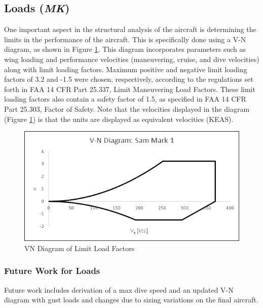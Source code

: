 \subsection{Loads (\textit{MK})}

One important aspect in the structural analysis of the aircraft is determining the limits in the performance of the aircraft. This is specifically done using a V-N diagram, as shown in Figure \ref{figVN}. This diagram incorporates parameters such as wing loading and performance velocities (maneuvering, cruise, and dive velocities) along with limit loading factors. Maximum positive and negative limit loading factors of 3.2 and -1.5 were chosen, respectively, according to the regulations set forth in FAA 14 CFR Part 25.337, Limit Maneuvering Load Factors. These limit loading factors also contain a safety factor of 1.5, as specified in FAA 14 CFR Part 25.303, Factor of Safety. Note that the velocities displayed in the diagram (Figure \ref{figVN}) is that the units are displayed as equivalent velocities (KEAS).

\begin{figure}[H]
    \centering
    \includegraphics[width=\linewidth]{Photos/VN_Diagram_(2-11-20).png}
    \caption{VN Diagram of Limit Load Factors}
    \label{figVN}
\end{figure}

\subsubsection{Future Work for Loads}
Future work includes derivation of a max dive speed and an updated V-N diagram with gust loads and changes due to sizing variations on the final aircraft. 

